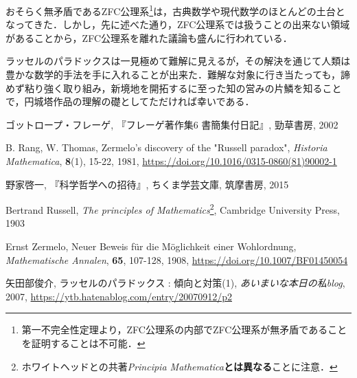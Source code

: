 \documentclass[10pt, a5paper, twoside]{jsarticle}
\theoremstyle{definition}
\begin{document}
		おそらく無矛盾であるZFC公理系\footnote{第一不完全性定理より，ZFC公理系の内部でZFC公理系が無矛盾であることを証明することは不可能．}は，古典数学や現代数学のほとんどの土台となってきた．しかし，先に述べた通り，ZFC公理系では扱うことの出来ない領域があることから，ZFC公理系を離れた議論も盛んに行われている．

		ラッセルのパラドックスは一見極めて難解に見えるが，その解決を通じて人類は豊かな数学的手法を手に入れることが出来た．難解な対象に行き当たっても，諦めず粘り強く取り組み，新境地を開拓するに至った知の営みの片鱗を知ることで，円城塔作品の理解の礎としてただければ幸いである．

	\begin{thebibliography}{99}

		 ゴットロープ・フレーゲ, 『フレーゲ著作集6 書簡集付日記』, 勁草書房, 2002

		 B. Rang, W. Thomas, Zermelo's discovery of the "Russell paradox", \textit{Historia Mathematica}, \textbf{8}(1), 15-22, 1981, \url{https://doi.org/10.1016/0315-0860(81)90002-1}

		 野家啓一, 『科学哲学への招待』, ちくま学芸文庫, 筑摩書房, 2015

		 Bertrand Russell, \textit{The principles of Mathematics}\footnote{ホワイトヘッドとの共著\textit{Principia Mathematica}\textbf{とは異なる}ことに注意．}, Cambridge University Press, 1903

		 Ernst Zermelo, Neuer Beweis für die Möglichkeit einer Wohlordnung, \textit{Mathematische Annalen}, \textbf{65}, 107-128, 1908, \url{https://doi.org/10.1007/BF01450054}

		 矢田部俊介, ラッセルのパラドックス : 傾向と対策(1), \textit{あいまいな本日の私blog}, 2007, \url{https://ytb.hatenablog.com/entry/20070912/p2}

	\end{thebibliography}
\end{document}
